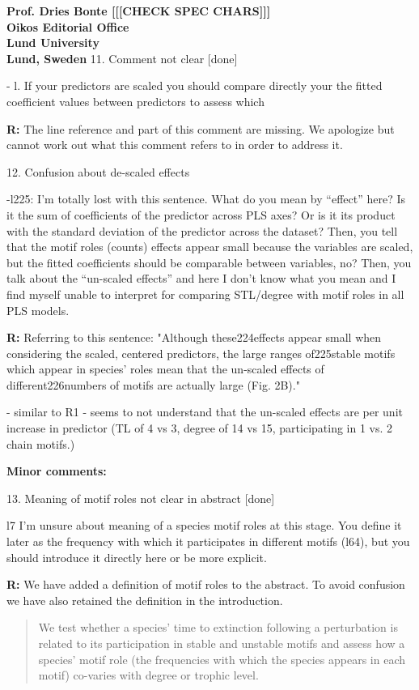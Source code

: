 \documentclass[12pt]{letter}
\begin{document}
\begin{letter}{\bf Prof. Dries Bonte [[[CHECK SPEC CHARS]]]\\
Oikos Editorial Office \\
Lund University \\
Lund, Sweden}
    11. Comment not clear [done]

      - l. If your predictors are scaled you should compare directly your the fitted coefficient values between predictors to assess which

      \textbf{R:} The line reference and part of this comment are missing. We apologize but cannot work out what this comment refers to in order to address it.


    12. Confusion about de-scaled effects

      -l225: I’m totally lost with this sentence. What do you mean by “effect” here? Is it the sum of coefficients of the predictor across PLS axes? Or is it its product with the standard deviation of the predictor across the dataset? Then, you tell that the motif roles (counts) effects appear small because the variables are scaled, but the fitted coefficients should be comparable between variables, no?  Then, you talk about the “un-scaled effects” and here I don’t know what you mean and I find myself unable to interpret for comparing STL/degree with motif roles in all PLS models.

      \textbf{R:}
      Referring to this sentence: "Although these224effects appear small when considering the scaled, centered predictors, the large ranges of225stable motifs which appear in species’ roles mean that the un-scaled effects of different226numbers of motifs are actually large (Fig. 2B)."

      - similar to R1 - seems to not understand that the un-scaled effects are per unit increase in predictor (TL of 4 vs 3, degree of 14 vs 15, participating in 1 vs. 2 chain motifs.)


  \textbf{Minor comments:}

    13. Meaning of motif roles not clear in abstract [done]

      l7  I’m unsure about meaning of a species motif roles at this stage. You define it later as the frequency with which it participates in different motifs (l64), but you should introduce it directly here or be more explicit.

      \textbf{R:} We have added a definition of motif roles to the abstract. To avoid confusion we have also retained the definition in the introduction.

      \begin{quotation}
       We test whether a species' time to extinction following a perturbation is related to its participation in stable and unstable motifs and assess how a species' motif role (the frequencies with which the species appears in each motif) co-varies with degree or trophic level.
      \end{quotation}



\end{letter}
\end{document}
